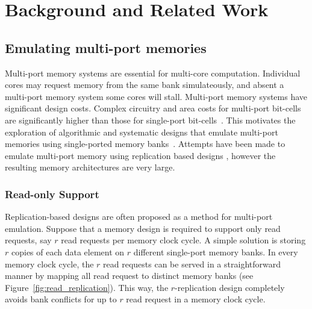 \section{Background and Related Work}
\label{sec:bg}

\subsection{Emulating multi-port memories}
\label{sec:emulation}

Multi-port memory systems are essential for multi-core computation. Individual cores may request memory from the same bank simulateously, and absent a multi-port memory system some cores will stall. Multi-port memory systems have significant design costs. Complex circuitry and area costs for multi-port bit-cells are significantly higher than those for single-port bit-cells~\cite{Suzuki,WLCH14}. This motivates the exploration of algorithmic and systematic designs that emulate multi-port memories using single-ported memory banks~\cite{ACP88, EMY91, RG91,Memoir_xor, Memoir_xor_virtual}. Attempts have been made to emulate multi-port memory using replication based designs \cite{CCES93}, however the resulting memory architectures are very large.


\subsubsection{Read-only Support} 
\label{sec:read_only}
Replication-based designs are often proposed as a method for multi-port emulation. Suppose that a memory design is required to support only read requests, say $r$ read requests per memory clock cycle. A simple solution is storing $r$ copies of each data element on $r$ different single-port memory banks. In every memory clock cycle, the $r$ read requests can be served in a straightforward manner by mapping all read request to distinct memory banks (see Figure~\ref{fig:read_replication}). This way, the $r$-replication design completely avoids bank conflicts for up to $r$ read request in a memory clock cycle. 

